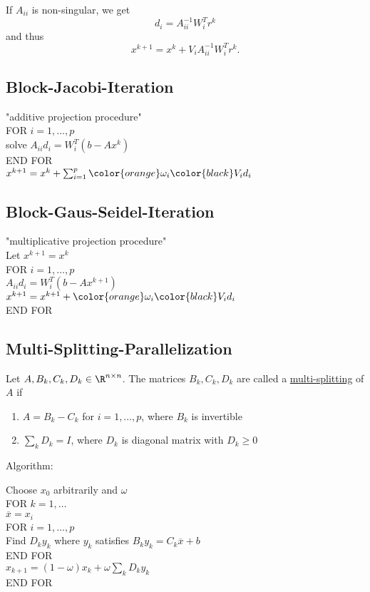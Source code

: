 If $A_{ii}$ is non-singular, we get
\[
d_{i} = A_{ii}^{-1} W_{i}^{T} r^{k}
\] 
and thus
\[
x^{k+1} = x^{k}+ V_{i}A_{ii}^{-1}W_{i}^{T} r^{k}
.\] 


\subsection*{Block-Jacobi-Iteration}
\label{sec:Block-Jacobi-Iteration}
"additive projection procedure"\\

FOR $i=1, \ldots, p$\\
\tab	solve $A_{ii}d_{i} = W_{i}^{T}(b-Ax^{k})$\\
END FOR\\
$x^{k+1}= x^{k} + \sum_{i=1}^{p}{\color{orange}\omega _{i}\color{black}V_{i}d_{i}}$

\subsection*{Block-Gaus-Seidel-Iteration}
\label{sec:Block-Jacobi-Iteration}
"multiplicative projection procedure"\\

Let $x^{k+1} = x^{k}$\\
FOR $i=1, \ldots, p$\\
\tab 	$A_{ii}d_{i} = W_{i}^{T}(b-Ax^{k+1})$\\
\tab 	$x^{k+1} = x^{k+1} +\color{orange}\omega _{i}\color{black} V_{i}d_{i}$\\
END FOR

\subsection*{Multi-Splitting-Parallelization}
\label{sec:Multi-Splitting-Parallelization}

\begin{definition}
	Let $A, B_{k}, C_{k}, D_{k}\in \R^{n \times n}$.
	The matrices $B_{k}, C_{k}, D_{k}$ are called a \underline{multi-splitting} of $A$ if
	\begin{enumerate}[label=(\arabic{enumi})]
		\item $A = B_{k} - C_{k}$ for $i=1, \ldots, p$, where $B_{k}$ is invertible
		\item $\sum_{k}^{}{D_{k}} = I$, where $D_{k}$ is diagonal matrix with $D_{k} \geq  0$
	\end{enumerate}
\end{definition}

Algorithm:

Choose $x_0$ arbitrarily and $\omega $\\
FOR $k=1,\ldots $ \\
\tab	$\overline{x} = x_{i}$\\
\tab	FOR $i=1, \ldots, p$\\
\tab	Find $D_{k}y_{k}$ where $y_{k}$ satisfies $B_{k}y_{k} = C_{k}\overline{x}+b$\\
\tab	END FOR\\
\tab	$x_{k+1} = (1-\omega ) x_{k} + \omega \sum_{k}^{}{D_{k}y_{k}}$\\
END FOR
